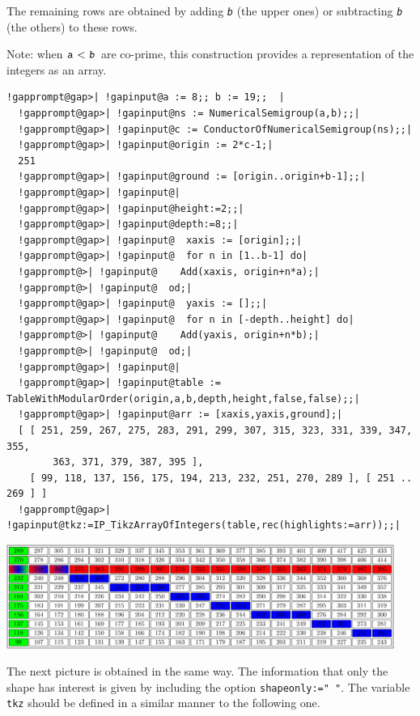 \documentclass[a4paper,11pt]{report}
\begin{document}
{{{ The remaining rows are obtained by adding \mbox{\texttt{\mdseries\slshape b}} (the upper ones) or subtracting \mbox{\texttt{\mdseries\slshape b}} (the others) to these rows. 

 Note: when $\mbox{\texttt{\mdseries\slshape a}} < \mbox{\texttt{\mdseries\slshape b}}$ are co-prime, this construction provides a representation of the integers as
an array. 

 }

 
\begin{Verbatim}[commandchars=!@|,fontsize=\small,frame=single,label=Example]
  !gapprompt@gap>| !gapinput@a := 8;; b := 19;;  |
  !gapprompt@gap>| !gapinput@ns := NumericalSemigroup(a,b);;|
  !gapprompt@gap>| !gapinput@c := ConductorOfNumericalSemigroup(ns);;|
  !gapprompt@gap>| !gapinput@origin := 2*c-1;|
  251
  !gapprompt@gap>| !gapinput@ground := [origin..origin+b-1];;|
  !gapprompt@gap>| !gapinput@|
  !gapprompt@gap>| !gapinput@height:=2;;|
  !gapprompt@gap>| !gapinput@depth:=8;;|
  !gapprompt@gap>| !gapinput@  xaxis := [origin];;|
  !gapprompt@gap>| !gapinput@  for n in [1..b-1] do|
  !gapprompt@>| !gapinput@    Add(xaxis, origin+n*a);|
  !gapprompt@>| !gapinput@  od;|
  !gapprompt@gap>| !gapinput@  yaxis := [];;|
  !gapprompt@gap>| !gapinput@  for n in [-depth..height] do|
  !gapprompt@>| !gapinput@    Add(yaxis, origin+n*b);|
  !gapprompt@>| !gapinput@  od;|
  !gapprompt@gap>| !gapinput@|
  !gapprompt@gap>| !gapinput@table := TableWithModularOrder(origin,a,b,depth,height,false,false);;|
  !gapprompt@gap>| !gapinput@arr := [xaxis,yaxis,ground];|
  [ [ 251, 259, 267, 275, 283, 291, 299, 307, 315, 323, 331, 339, 347, 355, 
        363, 371, 379, 387, 395 ], 
    [ 99, 118, 137, 156, 175, 194, 213, 232, 251, 270, 289 ], [ 251 .. 269 ] ]
  !gapprompt@gap>| !gapinput@tkz:=IP_TikzArrayOfIntegers(table,rec(highlights:=arr));;|
\end{Verbatim}
  \begin{center}
\includegraphics[width=0.95\textwidth]{../images/table_axis_ground_8_19}
\end{center}   The next picture is obtained in the same way. The information that only the
shape has interest is given by including the option \texttt{shape{\textunderscore}only:=" "}. The variable \texttt{tkz} should be defined in a similar manner to the following one. 
}}
\end{document}
